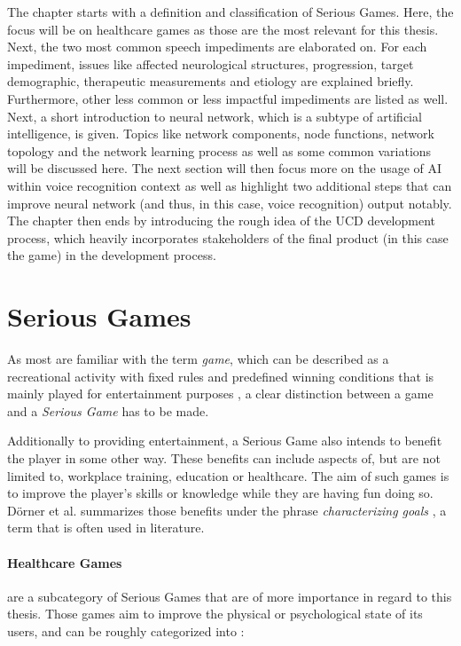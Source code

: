 \documentclass[draft,final]{vutinfth} %
\begin{document}
The chapter starts with a definition and classification of Serious Games. Here, the focus will be on healthcare games as those are the most relevant for this thesis. Next, the two most common speech impediments are elaborated on. For each impediment, issues like affected neurological structures, progression, target demographic, therapeutic measurements and etiology are explained briefly. Furthermore, other less common or less impactful impediments are listed as well. Next, a short introduction to neural network, which is a subtype of artificial intelligence, is given. Topics like network components, node functions, network topology and the network learning process as well as some common variations will be discussed here. The next section will then focus more on the usage of AI within voice recognition context as well as highlight two additional steps that can improve neural network (and thus, in this case, voice recognition) output notably. The chapter then ends by introducing the rough idea of the UCD development process, which heavily incorporates stakeholders of the final product (in this case the game) in the development process.
\section{Serious Games}
As most are familiar with the term \emph{game}, which can be described as a recreational activity with fixed rules and predefined winning conditions that is mainly played for entertainment purposes \cite{smed2003towards}, a clear distinction between a game and a \emph{Serious Game} has to be made.

Additionally to providing entertainment, a Serious Game \cite{susi2007serious} also intends to benefit the player in some other way. These benefits can include aspects of, but are not limited to, workplace training, education or healthcare. The aim of such games is to improve the player's skills or knowledge while they are having fun doing so. Dörner et al. summarizes those benefits under the phrase \emph{characterizing goals} \cite{dorner2016contributing}, a term that is often used in literature.

\paragraph{Healthcare Games} are a subcategory of Serious Games that are of more importance in regard to this thesis. Those games aim to improve the physical or psychological state of its users, and can be roughly categorized into \cite{susi2007serious}:
\end{document}
